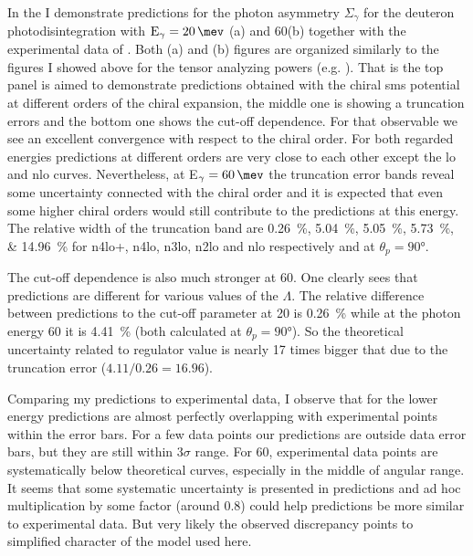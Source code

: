     In the  I demonstrate predictions
    for the photon asymmetry $\Sigma_\gamma$ for the 
    deuteron photodisintegration with $\text{E}_\gamma=\SI{20}{\mev}$ (a)
    and \SI{60}{\mev}(b) together with the experimental data of 
    \cite{KRAUSE1992_asymetry, depascale_asymmetry, Barannik_asymetry, Vnukov_asymmetry}.
    Both (a) and (b) figures are organized similarly to the 
    figures I showed above for the tensor analyzing powers (e.g. ).
    That is the top panel is aimed to demonstrate predictions obtained
    with the chiral \gls{sms} potential at different orders of the chiral expansion,
    the middle one is showing a truncation errors and the bottom one shows 
    the cut-off dependence. For that observable we see an excellent 
    convergence with respect to the chiral order. For both regarded 
    energies predictions at different orders are very close to each other
    except the \gls{lo} and \gls{nlo} curves. Nevertheless, at E$_\gamma = \SI{60}{\mev}$
    the truncation error bands reveal some uncertainty connected 
    with the chiral order and it is expected that even some higher chiral 
    orders would still contribute to the predictions at this energy.
    The relative width of the truncation band are 
    \SIlist{0.26;5.04;5.05;5.73;14.96}{\percent} for \gls{n4lo+}, \gls{n4lo}, \gls{n3lo},
    \gls{n2lo} and \gls{nlo} respectively and at $\theta_p=\ang{90}$.

    The cut-off dependence is also much stronger at \SI{60}{\mev}. One clearly sees
    that predictions are different for various values of the $\Lambda$.
    The relative difference between predictions to the cut-off parameter at \SI{20}{\mev}
    is \SI{0.26}{\percent} while at the photon energy \SI{60}{\mev}
    it is  \SI{4.41}{\percent} (both calculated at $\theta_p=\ang{90}$).
    So the theoretical uncertainty related to regulator value
    is nearly 17 times bigger that due to the truncation error ($4.11/0.26 = 16.96$).

     Comparing my predictions to experimental data, I observe that
     for the lower energy predictions are almost perfectly overlapping
     with experimental points within the error bars. 
     For a few data points our predictions are
     outside data error bars, but they are still within $3\sigma$ range.
     For \SI{60}{\mev}, experimental data points are systematically below theoretical
     curves, especially in the middle of angular range. It seems that some systematic 
     uncertainty is presented in predictions and ad hoc multiplication by some factor
     (around 0.8)
     could help predictions be more similar to experimental data. But very likely the observed discrepancy
     points to simplified character of the model used here.


